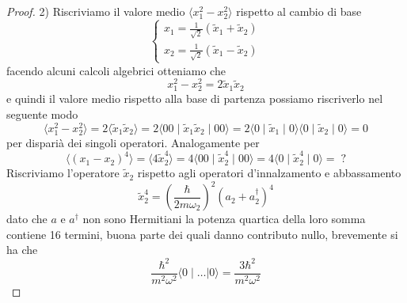 \begin{proof}
2) Riscriviamo il valore medio $\langle x_1^2-x_2^2 \rangle$ rispetto al cambio di base 
\begin{equation*}
	\left \{ \begin{array}{l}
		x_1 = \frac{1}{\sqrt{2}}(\tilde{x}_1 + \tilde{x}_2) \\[0.3cm]
		x_2 = \frac{1}{\sqrt{2}}(\tilde{x}_1 - \tilde{x}_2)
	\end{array}\right.
\end{equation*}
facendo alcuni calcoli algebrici otteniamo che 
\begin{equation*}
	x_1^2-x_2^2 = 2 \tilde{x}_1\tilde{x}_2
\end{equation*}
e quindi il valore medio rispetto alla base di partenza possiamo riscriverlo nel seguente modo
\begin{equation*}
	\langle x_1^2-x_2^2 \rangle = 2 \langle \tilde{x}_1\tilde{x}_2 \rangle = 2 \langle 00 \mid \tilde{x}_1 \tilde{x}_2 \mid 00 \rangle = 2\langle 0 \mid \tilde{x}_1 \mid 0 \rangle \langle 0 \mid \tilde{x}_2 \mid 0 \rangle  = 0
\end{equation*}
per dispari\`a dei singoli operatori. Analogamente per 
\begin{equation*}
	\langle (x_1-x_2)^4 \rangle = \langle 4 \tilde{x}_2^4 \rangle = 4 \langle 00 \mid \tilde{x}_2^4 \mid 00 \rangle  = 4 \langle 0 \mid \tilde{x}_2^4 \mid 0 \rangle = \;? 
\end{equation*}
Riscriviamo l'operatore $\tilde{x}_2$ rispetto agli operatori d'innalzamento e abbassamento
\begin{equation*}
	\tilde{x}_2^4 = \left ( \frac{\hbar}{2m \omega_2}\right)^2 (a_2 +a_2^\dag)^4
\end{equation*}
dato che $a$ e $a^\dag$ non sono Hermitiani la potenza quartica della loro somma contiene 16 termini, buona parte dei quali danno contributo nullo, brevemente si ha che 
\begin{equation*}
	\frac{\hbar^2}{m^2 \omega^2}\langle 0 \mid \ldots | 0 \rangle = \frac{3\hbar^2}{m^2\omega^2}
\end{equation*}


\end{proof}

